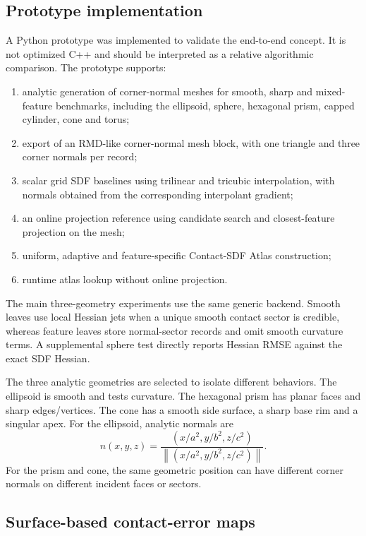 \documentclass[preprint,12pt,sort&compress]{elsarticle}
\newcommand{\norm}[1]{\left\lVert #1 \right\rVert}
\begin{document}
\subsection{Prototype implementation}

A Python prototype was implemented to validate the end-to-end concept. It is not optimized C++ and should be interpreted as a relative algorithmic comparison. The prototype supports:
\begin{enumerate}[label=(\arabic*), leftmargin=1.8em]
\item analytic generation of corner-normal meshes for smooth, sharp and mixed-feature benchmarks, including the ellipsoid, sphere, hexagonal prism, capped cylinder, cone and torus;
\item export of an RMD-like corner-normal mesh block, with one triangle and three corner normals per record;
\item scalar grid SDF baselines using trilinear and tricubic interpolation, with normals obtained from the corresponding interpolant gradient;
\item an online projection reference using candidate search and closest-feature projection on the mesh;
\item uniform, adaptive and feature-specific Contact-SDF Atlas construction;
\item runtime atlas lookup without online projection.
\end{enumerate}
The main three-geometry experiments use the same generic backend. Smooth leaves use local Hessian jets when a unique smooth contact sector is credible, whereas feature leaves store normal-sector records and omit smooth curvature terms. A supplemental sphere test directly reports Hessian RMSE against the exact SDF Hessian.

The three analytic geometries are selected to isolate different behaviors. The ellipsoid is smooth and tests curvature. The hexagonal prism has planar faces and sharp edges/vertices. The cone has a smooth side surface, a sharp base rim and a singular apex. For the ellipsoid, analytic normals are
\begin{equation}
 n(x,y,z)=\frac{(x/a^2,y/b^2,z/c^2)}{\norm{(x/a^2,y/b^2,z/c^2)}}.
\end{equation}
For the prism and cone, the same geometric position can have different corner normals on different incident faces or sectors.

\subsection{Surface-based contact-error maps}
\end{document}
